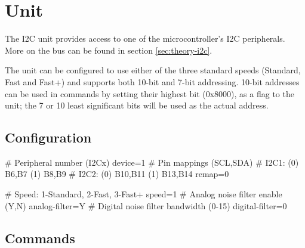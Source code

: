 \section{\IIC Unit}

The \gls{I2C} unit provides access to one of the microcontroller's \gls{I2C} peripherals. More on the \IIC bus can be found in section \ref{sec:theory-i2c}.

The unit can be configured to use either of the three standard speeds (Standard, Fast and Fast+) and supports both 10-bit and 7-bit addressing. 10-bit addresses can be used in commands by setting their highest bit (0x8000), as a flag to the unit; the 7 or 10 least significant bits will be used as the actual address.

\subsection{\IIC Configuration}

\begin{inicode}
[I2C:d@4]
# Peripheral number (I2Cx)
device=1
# Pin mappings (SCL,SDA)
#  I2C1: (0) B6,B7    (1) B8,B9
#  I2C2: (0) B10,B11  (1) B13,B14
remap=0

# Speed: 1-Standard, 2-Fast, 3-Fast+
speed=1
# Analog noise filter enable (Y,N)
analog-filter=Y
# Digital noise filter bandwidth (0-15)
digital-filter=0
\end{inicode}

\subsection{\IIC Commands}

